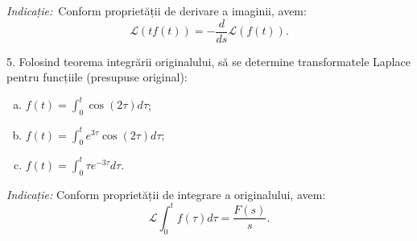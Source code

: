 \documentclass[12pt,a4paper]{article}
\newcommand\ds{\displaystyle}
\newcommand\Lap{\mathcal{L}}
\theoremstyle{dotless}
\theoremstyle{dotlessdr}
\begin{document}
\emph{Indicație:} Conform proprietății de derivare a imaginii, avem:
\[
  \Lap (t f(t)) = -\frac{d}{ds} \Lap (f(t)).
\]

\vspace{1cm}

5. Folosind teorema integrării originalului, să se determine transformatele Laplace pentru
funcțiile (presupuse original):
\begin{enumerate}[(a)]
\item $ f(t) = \ds\int_0^t \cos (2\tau) d\tau $;
\item $ f(t) = \ds\int_0^t e^{3 \tau} \cos(2 \tau) d\tau $;
\item $ f(t) = \ds\int_0^t \tau e^{-3\tau} d\tau $.
\end{enumerate}

\emph{Indicație:} Conform proprietății de integrare a originalului,
avem:
\[
  \Lap \int_0^t f(\tau) d\tau = \frac{F(s)}{s}.
\]
\end{document}
